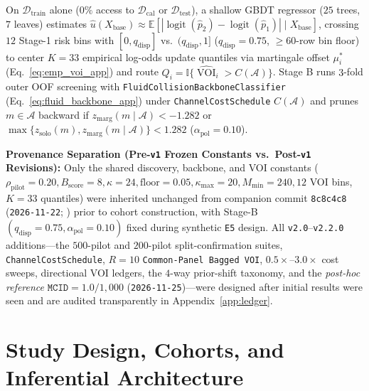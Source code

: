 \documentclass[11pt]{article}
\theoremstyle{remark}
\begin{document}
On $\mathcal{D}_{\text{train}}$ alone ($0\%$ access to $\mathcal{D}_{\text{cal}}$ or $\mathcal{D}_{\text{test}}$), a shallow GBDT regressor ($25$ trees, $7$ leaves) estimates $\hat{u}(X_{\text{base}}) \approx \mathbb{E}[|\operatorname{logit}(\hat{p}_2) - \operatorname{logit}(\hat{p}_1)| \mid X_{\text{base}}]$, crossing $12$ Stage-1 risk bins with $[0, q_{\text{disp}}]$ vs.\ $(q_{\text{disp}}, 1]$ ($q_{\text{disp}}=0.75$, $\ge 60$-row bin floor) to center $K=33$ empirical log-odds update quantiles via martingale offset $\mu_i^*$ (Eq.~\eqref{eq:emp_voi_app}) and route $Q_i = \mathbb{I}\{\widehat{\operatorname{VOI}}_i > C(\mathcal{A})\}$. Stage B runs $3$-fold outer OOF screening with \texttt{FluidCollisionBackboneClassifier} (Eq.~\eqref{eq:fluid_backbone_app}) under \texttt{ChannelCostSchedule} $C(\mathcal{A})$ and prunes $m \in \mathcal{A}$ backward if $z_{\text{marg}}(m \mid \mathcal{A}) < -1.282$ or $\max\{z_{\text{solo}}(m), z_{\text{marg}}(m \mid \mathcal{A})\} < 1.282$ ($\alpha_{\text{pol}} = 0.10$).

\textbf{Provenance Separation (Pre-\texttt{v1} Frozen Constants vs.\ Post-\texttt{v1} Revisions):} Only the shared discovery, backbone, and VOI constants ($\rho_{\text{pilot}}=0.20, B_{\text{score}}=8, \kappa=24, \text{floor}=0.05, \kappa_{\max}=20, M_{\min}=240, 12$ VOI bins, $K=33$ quantiles) were inherited unchanged from companion commit \texttt{8c8c4c8} (\texttt{2026-11-22}; \citealp{satz2026collision}) prior to cohort construction, with Stage-B $(q_{\text{disp}}=0.75, \alpha_{\text{pol}}=0.10)$ fixed during synthetic \texttt{E5} design. All \texttt{v2.0}--\texttt{v2.2.0} additions---the $500$-pilot and $200$-pilot split-confirmation suites, \texttt{ChannelCostSchedule}, $R=10$ \texttt{Common-Panel Bagged VOI}, $0.5\times\text{--}3.0\times$ cost sweeps, directional VOI ledgers, the $4$-way prior-shift taxonomy, and the \emph{post-hoc reference} $\texttt{MCID} = 1.0/1{,}000$ (\texttt{2026-11-25})---were designed after initial results were seen and are audited transparently in Appendix~\ref{app:ledger}.

\section{Study Design, Cohorts, and Inferential Architecture}
\label{sec:cohorts}
\end{document}

